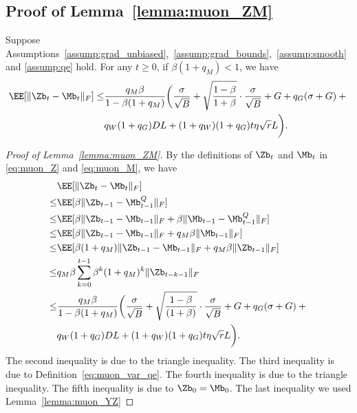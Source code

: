 \documentclass[11pt, letterpaper]{article}
\begin{document}
\subsection{Proof of Lemma~\ref{lemma:muon_ZM}}
\begin{lemma}\label{lemma:muon_ZM}
    Suppose Assumptions~\ref{assump:grad_unbiased},~\ref{assump:grad_bounds},~\ref{assump:smooth} and \ref{assump:qe} hold. For any $t\ge 0$, if $\beta(1+q_M)<1$, we have
    \begin{align*}
        \EE[\| \Zb_t - \Mb_t \|_F] \le& \frac{q_M\beta}{1-\beta(1+q_M)}\bigg( \frac{\sigma}{\sqrt{B}} + \sqrt{\frac{1-\beta}{1+\beta}}\cdot\frac{\sigma}{\sqrt{B}} + G + q_G(\sigma + G) + \notag \bigg.\\
        &\bigg. q_W (1+q_G)DL + (1+q_W)(1+q_G)t\eta\sqrt{r}L \bigg).
    \end{align*}
\end{lemma}
\begin{proof}[Proof of Lemma~\ref{lemma:muon_ZM}]
    By the definitions of $\Zb_t$ and $\Mb_t$ in \eqref{eq:muon_Z} and \eqref{eq:muon_M}, we have
    \begin{align}
        &\EE[\| \Zb_t - \Mb_t \|_F]\notag\\
        \le& \EE[\beta \| \Zb_{t-1} - \Mb_{t-1}^Q \|_F] \notag \\
        \le& \EE[\beta \| \Zb_{t-1} - \Mb_{t-1} \|_F +\beta\|\Mb_{t-1}-\Mb_{t-1}^Q\|_F ] \notag \\
        \le& \EE[\beta \| \Zb_{t-1} - \Mb_{t-1} \|_F +q_M\beta\|\Mb_{t-1}\|_F ] \notag \\
        \le& \EE[\beta(1+q_M) \| \Zb_{t-1} - \Mb_{t-1} \|_F +q_M\beta\|\Zb_{t-1}\|_F ] \notag \\
        \le& q_M\beta\sum_{k=0}^{t-1}\beta^k(1+q_M)^k\|\Zb_{t-k-1}\|_F \notag \\
        \le& \frac{q_M\beta}{1-\beta(1+q_M)}\bigg( \frac{\sigma}{\sqrt{B}} + \sqrt{\frac{1-\beta}{(1+\beta)}}\cdot\frac{\sigma}{\sqrt{B}} + G + q_G(\sigma + G) + \notag \bigg.\\
        &\bigg. q_W (1+q_G)DL + (1+q_W)(1+q_G)t\eta\sqrt{r}L \bigg).
    \end{align}
    The second inequality is due to the triangle inequality. The third inequality is due to Definition~\ref{eq:muon_var_qe}. The fourth inequality is due to the triangle inequality. The fifth inequality is due to $\Zb_0=\Mb_0$. The last inequality we used Lemma~\ref{lemma:muon_YZ}
\end{proof}
\end{document}
